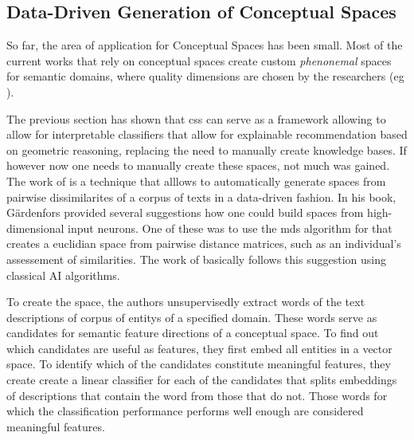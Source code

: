 
\subsection{Data-Driven Generation of Conceptual Spaces}
\label{sec:generate_cs}

So far, the area of application for Conceptual Spaces has been small. Most of the current works that rely on conceptual spaces create custom \textit{phenonemal} spaces for semantic domains, where quality dimensions are chosen by the researchers (eg \cite{Schockaert2011}). 

The previous section has shown that \glspl{cs} can serve as a framework allowing to allow for interpretable classifiers that allow for explainable recommendation based on geometric reasoning, replacing the need to manually create knowledge bases. If however now one needs to manually create these spaces, not much was gained. The work of \cite{Derrac2015} is a technique that alllows to automatically generate spaces from pairwise dissimilarites of a corpus of texts in a data-driven fashion. In his book, Gärdenfors provided several suggestions how one could build spaces from high-dimensional input neurons. One of these was to use the \gls{mds} algorithm for that creates a euclidian space from pairwise distance matrices, such as an individual's assessement of similarities. The work of \cite{Derrac2015} basically follows this suggestion using classical AI algorithms. %

To create the space, the authors unsupervisedly extract words of the text descriptions of corpus of \glspl{entity} of a specified domain. These words serve as candidates for semantic feature directions of a conceptual space. To find out which candidates are useful as features, they first embed all entities in a vector space. To identify which of the candidates constitute meaningful features, they create create a linear classifier for each of the candidates that splits embeddings of descriptions that contain the word from those that do not. Those words for which the classification performance performs well enough are considered meaningful features.  

